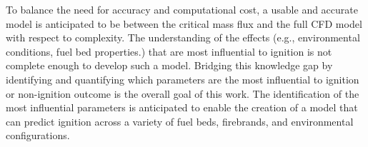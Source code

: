     To balance the need for accuracy and computational cost, a usable and accurate model is anticipated to be between the critical mass flux and the full CFD model with respect to complexity. The understanding of the effects (e.g., environmental conditions, fuel bed properties.) that are most influential to ignition is not complete enough to develop such a model. Bridging this knowledge gap by identifying and quantifying which parameters are the most influential to ignition or non-ignition outcome is the overall goal of this work. The identification of the most influential parameters is anticipated to enable the creation of a model that can predict ignition across a variety of fuel beds, firebrands, and environmental configurations.
